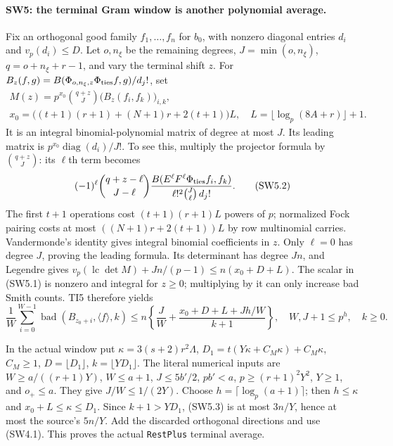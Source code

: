 \documentclass[11pt,a4paper]{article}
\numberwithin{equation}{section}
\theoremstyle{remark}\newtheorem{remark}[theorem]{Remark}
\begin{document}
\paragraph{SW5: the terminal Gram window is another polynomial average.}
Fix an orthogonal good family $f_1,\ldots,f_n$ for $b_0$, with nonzero
diagonal entries $d_i$ and $v_p(d_i)\le D$. Let $o,n_\xi$ be the remaining
degrees, $J=\min(o,n_\xi)$, $q=o+n_\xi+r-1$, and vary the terminal shift $z$.
For
$B_z(f,g)=B(\Phi_{o,n_\xi,z}\Phi_{\rm ties}f,g)/d_j!$, set
\[
 \begin{gathered}
 M(z)=p^{x_0}\binom{q+z}{J}\big(B_z(f_i,f_k)\big)_{i,k},\\
 x_0=\big((t+1)(r+1)+(N+1)r+2(t+1)\big)L,\quad
 L=\lfloor\log_p(8A+r)\rfloor+1.
 \end{gathered}
 \tag{SW5.1}
\]
It is an integral binomial-polynomial matrix of degree at most $J$.
Its leading matrix is $p^{x_0}\operatorname{diag}(d_i)/J!$.
To see this, multiply the projector formula by $\binom{q+z}J$:
its $\ell$th term becomes
\[
 (-1)^\ell\binom{q+z-\ell}{J-\ell}
 \frac{B(E^\ell F^\ell\Phi_{\rm ties}f_i,f_k)}
      {\ell!^2\binom J\ell\,d_j!}.
 \tag{SW5.2}
\]
The first $t+1$ operations cost $(t+1)(r+1)L$ powers of $p$;
normalized Fock pairing costs at most $((N+1)r+2(t+1))L$ by row
multinomial carries. Vandermonde's identity gives integral binomial
coefficients in $z$. Only $\ell=0$ has degree $J$, proving the leading formula.
Its determinant has degree $Jn$, and Legendre gives
$v_p(\operatorname{lc}\det M)+Jn/(p-1)\le n(x_0+D+L)$.
The scalar in (SW5.1) is nonzero and integral for $z\ge0$; multiplying
by it can only increase bad Smith counts. TI5 therefore yields
\[
 \frac1W\sum_{i=0}^{W-1}\operatorname{bad}(B_{z_0+i},\langle f\rangle,k)
 \le n\left\{\frac JW+
       \frac{x_0+D+L+Jh/W}{k+1}\right\},
 \quad W,J+1\le p^h,\quad k\ge0.
 \tag{SW5.3}
\]

In the actual window put
$\kappa=3(s+2)r^2\Lambda$,
$D_1=t(Y\kappa+C_M\kappa)+C_M\kappa$, $C_M\ge1$,
$D=\lfloor D_1\rfloor$, $k=\lfloor YD_1\rfloor$.
The literal numerical inputs are
$W\ge a/((r+1)Y)$, $W\le a+1$,
$J\le5b'/2$, $pb'<a$, $p\ge(r+1)^2Y^2$, $Y\ge1$, and $o_+\le a$.
They give $J/W\le1/(2Y)$.
Choose $h=\lceil\log_p(a+1)\rceil$; then $h\le\kappa$ and
$x_0+L\le\kappa\le D_1$. Since $k+1>YD_1$, (SW5.3) is at most
$3n/Y$, hence at most the source's $5n/Y$.
Add the discarded orthogonal directions and use (SW4.1). This proves
the actual \texttt{RestPlus} terminal average.
\end{document}
